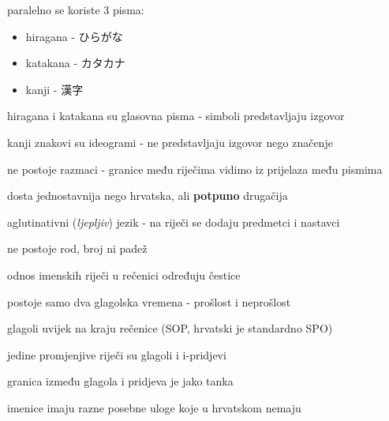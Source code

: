 	\begin{hyou}
		\item paralelno se koriste 3 pisma:
		\begin{itemize}
			\itemsep-5pt
			\item hiragana - ひらがな
			\item katakana - カタカナ
			\item kanji - 漢字
		\end{itemize}
		\item hiragana i katakana su glasovna pisma - simboli predstavljaju izgovor
		\item kanji znakovi su ideogrami - ne predstavljaju izgovor nego značenje
		\item ne postoje razmaci - granice među riječima vidimo iz prijelaza među pismima
	\end{hyou}

	\fukudai{Gramatika}
	\begin{hyou}
		\item dosta jednostavnija nego hrvatska, ali \textbf{potpuno} drugačija
		\item aglutinativni (\textit{ljepljiv}) jezik - na riječi se dodaju predmetci i nastavci
		\item ne postoje rod, broj ni padež
		\item odnos imenskih riječi u rečenici određuju čestice
		\item postoje samo dva glagolska vremena - prošlost i neprošlost
		\item glagoli uvijek na kraju rečenice (SOP, hrvatski je standardno SPO)
		\item jedine promjenjive riječi su glagoli i i-pridjevi
		\item granica između glagola i pridjeva je jako tanka
		\item imenice imaju razne posebne uloge koje u hrvatskom nemaju
	\end{hyou}

